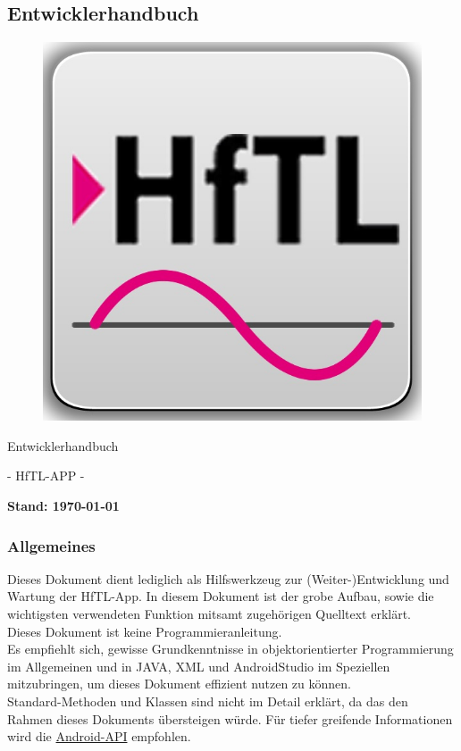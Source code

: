 \newpage
\subsection{Entwicklerhandbuch}

\begin{figure}[h]
	\centering
	\includegraphics[scale=0.5]{03_Bedienungsanleitung/img/Logo_HFTl_App.jpg}
	\label{img:grafik-dummy}
\end{figure}

\begin{center}
	{\huge Entwicklerhandbuch}
\end{center}

\begin{center}
	{\huge -  HfTL-APP  -}
\end{center}

\begin{center}
	\textbf{{\large Stand: {\today}}}
\end{center}

\newpage
\tableofcontents
\newpage

\subsubsection{Allgemeines}
Dieses Dokument dient lediglich als Hilfswerkzeug zur (Weiter-)Entwicklung und Wartung der HfTL-App. In diesem Dokument ist der grobe Aufbau, sowie die wichtigsten verwendeten Funktion mitsamt zugehörigen Quelltext erklärt.
\\[1em]
Dieses Dokument ist keine Programmieranleitung.
\\[1em]
Es empfiehlt sich, gewisse Grundkenntnisse in objektorientierter Programmierung im Allgemeinen und  in JAVA, XML und AndroidStudio im Speziellen mitzubringen, um dieses Dokument effizient nutzen zu können.
\\[1em]
Standard-Methoden und Klassen sind nicht im Detail erklärt, da das den Rahmen dieses Dokuments übersteigen würde. Für tiefer greifende Informationen wird die \href{http://developer.android.com/reference/packages.html}{Android-API} empfohlen.
\newpage

